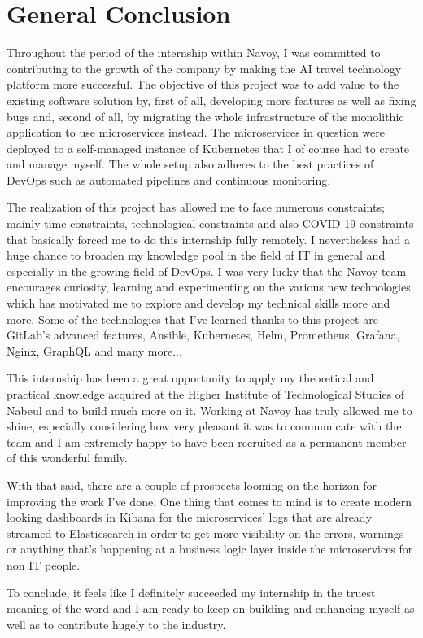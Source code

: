 \thispagestyle{plain} %
\section*{General Conclusion}
Throughout the period of the internship within Navoy, I was committed to contributing to the growth of the company by making the AI travel technology platform more successful.
The objective of this project was to add value to the existing software solution by, first of all, developing more features as well as fixing bugs and, second of all, by migrating the whole infrastructure of the monolithic application to use microservices instead.
The microservices in question were deployed to a self-managed instance of Kubernetes that I of course had to create and manage myself.
The whole setup also adheres to the best practices of DevOps such as automated pipelines and continuous monitoring.

The realization of this project has allowed me to face numerous constraints; mainly time constraints, technological constraints and also COVID-19 constraints that basically forced me to do this internship fully remotely. I nevertheless had a huge chance to broaden my knowledge pool in the field of IT in general and especially in the growing field of DevOps.
I was very lucky that the Navoy team encourages curiosity, learning and experimenting on the various new technologies which has motivated me to explore and develop my technical skills more and more.
Some of the technologies that I've learned thanks to this project are GitLab's advanced features, Ansible, Kubernetes, Helm, Prometheus, Grafana, Nginx, GraphQL and many more...

This internship has been a great opportunity to apply my theoretical and practical knowledge acquired at the Higher Institute of Technological Studies of Nabeul and to build much more on it.
Working at Navoy has truly allowed me to shine, especially considering how very pleasant it was to communicate with the team and I am extremely happy to have been recruited as a permanent member of this wonderful family.

With that said, there are a couple of prospects looming on the horizon for improving the work I've done.
One thing that comes to mind is to create modern looking dashboards in Kibana for the microservices' logs that are already streamed to Elasticsearch in order to get more visibility on the errors, warnings or anything that's happening at a business logic layer inside the microservices for non IT people.

To conclude, it feels like I definitely succeeded my internship in the truest meaning of the word and I am ready to keep on building and enhancing myself as well as to contribute hugely to the industry.

\newpage
